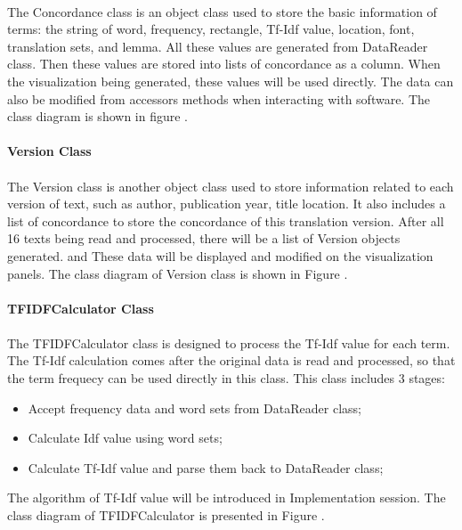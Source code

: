 \paragraph[]{}

The Concordance class is an object class used to store the basic information of terms: the string of word, frequency, rectangle, Tf-Idf value, location, font, translation sets, and lemma. All these values are generated from DataReader class. Then these values are stored into lists of concordance as a column. When the visualization being generated, these values will be used directly. The data can also be modified from accessors methods when interacting with software. The class diagram is shown in figure \label{concordance}.

\paragraph{Version Class}

\paragraph[]{}
The Version class is another object class used to store information related to each version of text, such as author, publication year, title location. It also includes a list of concordance to store the concordance of this translation version. After all 16 texts being read and processed, there will be a list of Version objects generated. and These data will be displayed and modified on the visualization panels. The class diagram of Version class is shown in Figure \label{verson}.

\paragraph{TFIDFCalculator Class}

\paragraph[]{}
The TFIDFCalculator class is designed to process the Tf-Idf value for each term. The Tf-Idf calculation comes after the original data is read and processed, so that the term frequecy can be used directly in this class. This class includes 3 stages:
\begin{itemize}
	\item \textbf{}Accept frequency data and word sets from DataReader class;
	\item \textbf{}Calculate Idf value using word sets;
	\item \textbf{}Calculate Tf-Idf value and parse them back to DataReader class;
\end{itemize} 
The algorithm of Tf-Idf value will be introduced in Implementation session. The class diagram of TFIDFCalculator is presented in Figure \label{tFiDFCalculator}.

